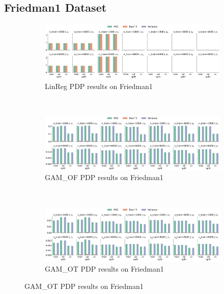 \documentclass[runningheads]{llncs}
\begin{document}
\clearpage
\subsection{Friedman1 Dataset}

\begin{figure}[h!]
    \centering
    \begin{subfigure}[b]{\textwidth}
        \centering
        \includegraphics[width=\textwidth]{img/Friedman1-all/feature_effect_errors_pdp_LinReg.png}
        \caption{LinReg PDP results on Friedman1}
    \end{subfigure}
    \\[10pt]
    \vfill
    \begin{subfigure}[b]{\textwidth}
        \centering
        \includegraphics[width=\textwidth]{img/Friedman1-all/feature_effect_errors_pdp_GAM_OF.png}
        \caption{GAM\_OF PDP results on Friedman1}
    \end{subfigure}
    \\[10pt]
    \vfill
    \begin{subfigure}[b]{\textwidth}
        \centering
        \includegraphics[width=\textwidth]{img/Friedman1-all/feature_effect_errors_pdp_GAM_OT.png}
        \caption{GAM\_OT PDP results on Friedman1}
    \end{subfigure}
\end{figure}
\end{document}
